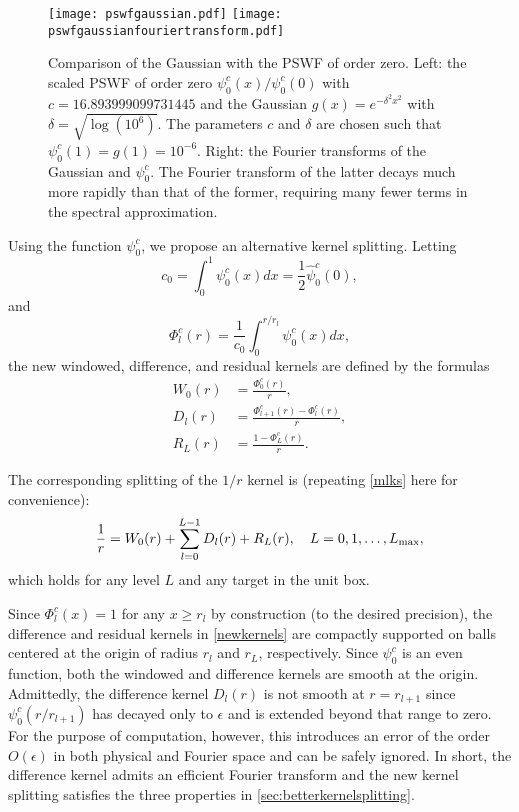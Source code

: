 \documentclass[final,letterpaper]{siamart171218}
\newcommand{\be}{\begin{equation}}
\newcommand{\ee}{\end{equation}}
\newcommand{\ba}{\begin{aligned}}
\newcommand{\ea}{\end{aligned}}
\newcommand{\psic}{{\psi_0^c}}
\newcommand{\hpsic}{{\hat{\psi}_0^c}}
\newcommand{\cR}{r}
\begin{document}
\begin{figure}[!ht]
\centering
\texttt{[image: pswfgaussian.pdf]}
\hspace{0.4in}
\texttt{[image: pswfgaussianfouriertransform.pdf]}
\caption{\sf Comparison of the Gaussian with the PSWF of order zero.
  Left: the scaled PSWF of order zero $\psic(x)/\psic(0)$ with $c=16.893999099731445$
  and the Gaussian $g(x)=e^{-\delta^2 x^2}$ with $\delta=\sqrt{\log(10^6)}$.
  The parameters $c$ and $\delta$ are chosen such that $\psic(1)=g(1)=10^{-6}$.
  Right: the Fourier transforms of the Gaussian and $\psic$. 
  The Fourier transform of the latter decays much more rapidly
  than that of the former, requiring many fewer terms in the spectral approximation.}
\label{pswfgaussian}
\end{figure}

Using the function $\psic$, we propose an alternative kernel splitting. Letting
\be
c_0 = \int_{0}^1 \psic(x)dx = \frac{1}{2}\hpsic(0),
\ee
and
\be
\Phi^c_l(r) = \frac{1}{c_0} \int_0^{r/\cR_l}\psic(x)dx,
\ee
the new windowed, difference, and residual kernels are
defined by the formulas
\be\label{newkernels}
\ba
W_0(r) &= \frac{\Phi^c_0(r)}{r},\\
D_l(r) &=\frac{\Phi^c_{l+1}(r)-\Phi^c_{l}(r)}{r},\\
R_L(r) &=\frac{1-\Phi^c_L(r)}{r}.
\ea
\ee

The corresponding splitting of the $1/r$ kernel is (repeating \eqref{mlks} here
for convenience):
\[
\frac{1}{r} = W_0(r) + \sum_{l=0}^{L-1} D_l(r) + R_L(r), \quad L=0, 1, \ldots, L_{\rm max},
\]
which holds for any level $L$ and any target in the unit box.

Since $\Phi^c_l(x)=1$ for any $x \geq \cR_l$  by construction (to the desired
precision),
the difference and residual kernels in \cref{newkernels} are compactly supported
on balls centered at the origin of radius $\cR_l$ and $\cR_L$, respectively.
Since $\psic$ is an even function,
both the windowed and difference kernels are smooth at the origin.
Admittedly, the difference kernel $D_l(r)$ is not smooth at $r=\cR_{l+1}$ since
$\psic(r/\cR_{l+1})$ has decayed only to $\epsilon$ and is extended beyond that
range to zero. For the purpose of computation, however, this introduces an error
of the order $O(\epsilon)$ in both physical and Fourier space and can be safely ignored.
In short, the difference kernel
admits an efficient Fourier transform and the new kernel splitting satisfies the 
three properties in \cref{sec:betterkernelsplitting}.
\end{document}
